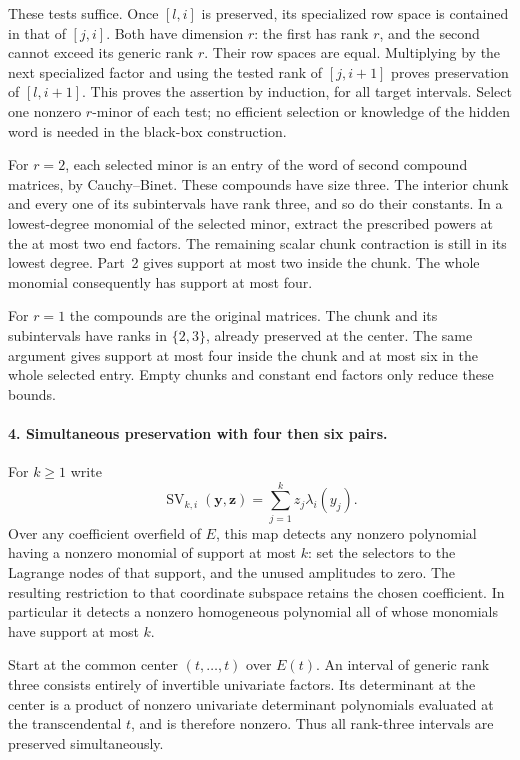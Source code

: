 These tests suffice.  Once $[l,i]$ is preserved, its specialized
row space is contained in that of $[j,i]$.  Both have dimension
$r$: the first has rank $r$, and the second cannot exceed its
generic rank $r$.  Their row spaces are equal.  Multiplying by
the next specialized factor and using the tested rank of
$[j,i+1]$ proves preservation of $[l,i+1]$.  This proves the
assertion by induction, for all target intervals.  Select one
nonzero $r$-minor of each test; no efficient selection or knowledge
of the hidden word is needed in the black-box construction.

For $r=2$, each selected minor is an entry of the word of second
compound matrices, by Cauchy--Binet.  These compounds have size
three.  The interior chunk and every one of its subintervals have
rank three, and so do their constants.  In a lowest-degree
monomial of the selected minor, extract the prescribed powers at
the at most two end factors.  The remaining scalar chunk
contraction is still in its lowest degree.  Part~2 gives support
at most two inside the chunk.  The whole monomial consequently
has support at most four.

For $r=1$ the compounds are the original matrices.  The chunk and
its subintervals have ranks in $\{2,3\}$, already preserved at
the center.  The same argument gives support at most four
inside the chunk and at most six in the whole selected entry.
Empty chunks and constant end factors only reduce these bounds.

\paragraph{4. Simultaneous preservation with four then six pairs.}
For $k\ge1$ write
\[
 \operatorname{SV}_{k,i}(\mathbf y,\mathbf z)
      =\sum_{j=1}^kz_j\lambda_i(y_j).
\]
Over any coefficient overfield of $E$, this map detects any
nonzero polynomial having a nonzero monomial of support at most
$k$: set the selectors to the Lagrange nodes of that support,
and the unused amplitudes to zero.  The resulting restriction
to that coordinate subspace retains the chosen coefficient.
In particular it detects a nonzero homogeneous polynomial all
of whose monomials have support at most $k$.

Start at the common center $(t,\ldots,t)$ over $E(t)$.
An interval of generic rank three consists entirely of invertible
univariate factors.  Its determinant at the center is a product
of nonzero univariate determinant polynomials evaluated at the
transcendental $t$, and is therefore nonzero.  Thus all rank-three
intervals are preserved simultaneously.

